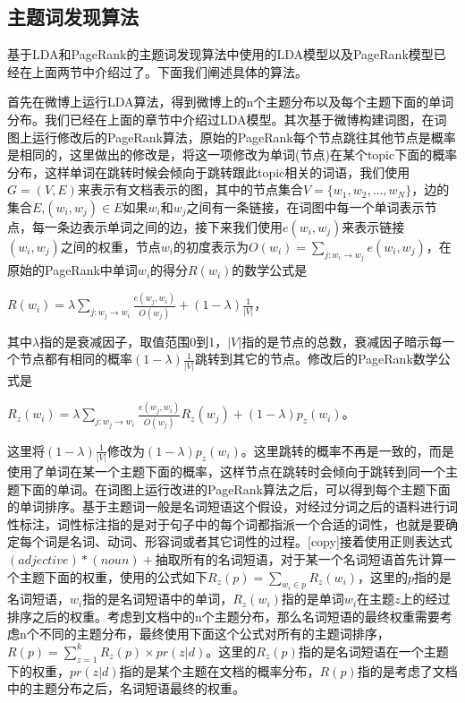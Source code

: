 \documentclass[master]{njuthesis}
\begin{document}
\subsection{主题词发现算法}

    基于LDA和PageRank的主题词发现算法中使用的LDA模型以及PageRank模型已经在上面两节中介绍过了。下面我们阐述具体的算法。

    首先在微博上运行LDA算法，得到微博上的n个主题分布以及每个主题下面的单词分布。我们已经在上面的章节中介绍过LDA模型。其次基于微博构建词图，在词图上运行修改后的PageRank算法，原始的PageRank每个节点跳往其他节点是概率是相同的，这里做出的修改是，将这一项修改为单词(节点)在某个topic下面的概率分布，这样单词在跳转时候会倾向于跳转跟此topic相关的词语，我们使用$G=\left(V,E\right)$来表示有文档表示的图，其中的节点集合$V=\{w_1,w_2,\dots,w_N\}$，边的集合$E$,$\left(w_i,w_j\right) \in E$如果$w_i$和$w_j$之间有一条链接，在词图中每一个单词表示节点，每一条边表示单词之间的边，接下来我们使用$e\left(w_i,w_j\right)$来表示链接$\left(w_i,w_j\right)$之间的权重，节点$w_i$的初度表示为$O\left(w_i\right) = \sum_{j:w_i \rightarrow w_j} e\left(w_i,w_j\right)$，在原始的PageRank中单词$w_i$的得分$R\left(w_i\right)$的数学公式是
  
    $R\left( w_i \right) = \lambda \sum_{j:w_j \rightarrow w_i} \frac{e\left(w_j,w_i\right)}{O\left(w_j\right)}+\left(1-\lambda\right)\frac{1}{\vert V \vert}$，

    其中$\lambda$指的是衰减因子，取值范围0到1，$\vert V \vert$指的是节点的总数，衰减因子暗示每一个节点都有相同的概率$\left(1-\lambda\right)\frac{1}{\vert V \vert}$跳转到其它的节点。修改后的PageRank数学公式是

    $R_z\left( w_i \right) = \lambda \sum_{j:w_j \rightarrow w_i} \frac{e\left(w_j, w_i\right)}{O\left(w_j\right)}R_z\left(w_j\right)+\left( 1-\lambda \right)p_z\left(w_i\right)$。
 
    这里将$\left(1-\lambda\right)\frac{1}{\vert V \vert}$修改为$\left( 1-\lambda\right)p_z\left(w_i\right)$。这里跳转的概率不再是一致的，而是使用了单词在某一个主题下面的概率，这样节点在跳转时会倾向于跳转到同一个主题下面的单词。在词图上运行改进的PageRank算法之后，可以得到每个主题下面的单词排序。基于主题词一般是名词短语这个假设，对经过分词之后的语料进行词性标注，词性标注指的是对于句子中的每个词都指派一个合适的词性，也就是要确定每个词是名词、动词、形容词或者其它词性的过程。[copy]接着使用正则表达式$\left(adjective\right)*\left(noun\right)+$抽取所有的名词短语，对于某一个名词短语首先计算一个主题下面的权重，使用的公式如下$R_z\left(p\right) = \sum_{w_i \in p} R_z\left(w_i\right)$，这里的$p$指的是名词短语，$w_i$指的是名词短语中的单词，$R_z\left(w_i\right)$指的是单词$w_i$在主题$z$上的经过排序之后的权重。考虑到文档中的n个主题分布，那么名词短语的最终权重需要考虑n个不同的主题分布，最终使用下面这个公式对所有的主题词排序，$R\left(p\right) = \sum_{z=1}^k R_z\left(p\right) \times pr\left(z \vert d \right)$。这里的$R_z\left(p\right)$指的是名词短语在一个主题下的权重，$pr\left(z\vert d\right)$指的是某个主题在文档的概率分布，$R\left(p\right)$指的是考虑了文档中的主题分布之后，名词短语最终的权重。
\end{document}
